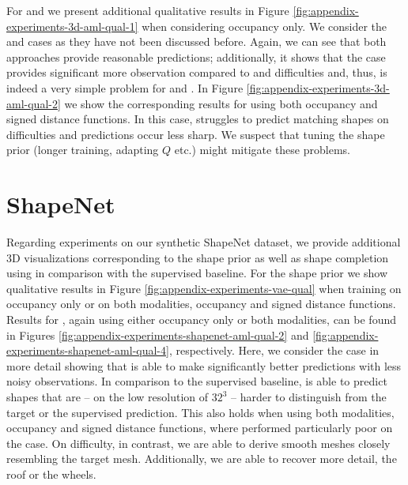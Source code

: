 For \AML and \EVAE we present additional qualitative results in Figure
\ref{fig:appendix-experiments-3d-aml-qual-1} when considering occupancy only.
We consider the \easy and \moderate cases as they have not been discussed before.
Again, we can see that both approaches provide reasonable predictions; additionally,
it shows that the \easy case provides significant more observation compared to
\moderate and \hard difficulties and, thus, is indeed a very simple problem
for \AML and \EVAE. In Figure \ref{fig:appendix-experiments-3d-aml-qual-2}
we show the corresponding results for \AML using both occupancy and signed distance
functions. In this case, \AML struggles to predict matching shapes on \moderate
difficulties and predictions occur less sharp. We suspect that
tuning the shape prior (\ie longer training, adapting $Q$ etc.) might mitigate these
problems.





\FloatBarrier
\newpage
\section{ShapeNet}
\label{sec:appendix-experiments-shapenet}

Regarding experiments on our synthetic ShapeNet \cite{ChangFunkhouserGuibasSavarese:2015} dataset,
we provide additional 3D visualizations corresponding to the \VAE shape prior
as well as shape completion using \AML in comparison with the supervised baseline.
For the \VAE shape prior we show qualitative results
in Figure \ref{fig:appendix-experiments-vae-qual}
when training on occupancy only or on both modalities, \ie occupancy and
signed distance functions.
Results for \AML, again using
either occupancy only or both modalities, can be found in Figures
\ref{fig:appendix-experiments-shapenet-aml-qual-2} and
\ref{fig:appendix-experiments-shapenet-aml-qual-4}, respectively. Here, we consider
the \moderate case in more detail showing that \AML is able to make significantly
better predictions with less noisy observations. In comparison to the
supervised baseline, \AML
is able to predict shapes that are -- on the low resolution of $32^3$ --
harder to distinguish from the target or the supervised prediction.
This also holds when using both modalities, \ie occupancy and
signed distance functions, where \AML performed particularly
poor on the \hard case. On \moderate difficulty, in contrast, we are able to
derive smooth meshes closely resembling the target mesh. Additionally,
we are able to recover more detail, \eg the roof or the wheels.

